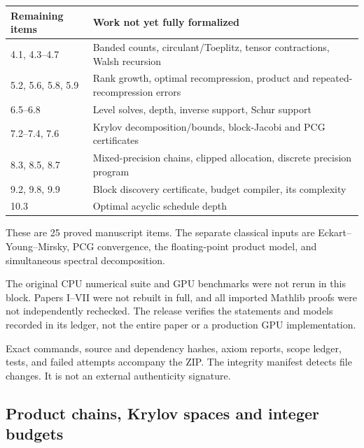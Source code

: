 \begin{center}\small
\renewcommand{\arraystretch}{1.2}
\begin{tabular}{@{}p{}p{}@{}}
\toprule
Remaining items & Work not yet fully formalized\\
\midrule
4.1, 4.3--4.7 & Banded counts, circulant/Toeplitz, tensor contractions, Walsh recursion\\
5.2, 5.6, 5.8, 5.9 & Rank growth, optimal recompression, product and repeated-recompression errors\\
6.5--6.8 & Level solves, depth, inverse support, Schur support\\
7.2--7.4, 7.6 & Krylov decomposition/bounds, block-Jacobi and PCG certificates\\
8.3, 8.5, 8.7 & Mixed-precision chains, clipped allocation, discrete precision program\\
9.2, 9.8, 9.9 & Block discovery certificate, budget compiler, its complexity\\
10.3 & Optimal acyclic schedule depth\\
\bottomrule
\end{tabular}
\end{center}
These are 25 proved manuscript items. The separate classical inputs are Eckart--Young--Mirsky, PCG convergence, the floating-point product model, and simultaneous spectral decomposition.

The original CPU numerical suite and GPU benchmarks were not rerun in this block. Papers I--VII were not rebuilt in full, and all imported Mathlib proofs were not independently rechecked. The release verifies the statements and models recorded in its ledger, not the entire paper or a production GPU implementation.

Exact commands, source and dependency hashes, axiom reports, scope ledger, tests, and failed attempts accompany the ZIP. The integrity manifest detects file changes. It is not an external authenticity signature.


\subsection{Product chains, Krylov spaces and integer budgets}\label{sec:history-3}


